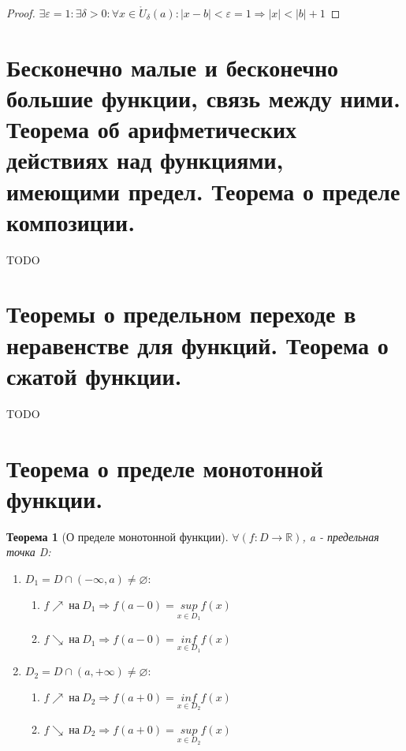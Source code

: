 \documentclass[11pt,a4paper,titlepage]{article}
\newtheorem*{theorem}{Теорема}
\renewcommand{\sup}[1]{\underset{#1}{sup}}
\renewcommand{\inf}[1]{\underset{#1}{inf}}
\renewcommand{\implies}{\Rightarrow}
\renewcommand{\emptyset}{\varnothing}
\renewcommand{\epsilon}{\varepsilon}
\newcommand{\R}{\mathbb{R}}
\renewcommand{\U}{\mathring{U}}
\begin{document}
    \begin{proof}
        $\exists \epsilon = 1: \exists \delta > 0: \forall x \in \U_\delta(a): |x-b| < \epsilon = 1 \implies |x| < |b| + 1$
    \end{proof}


    \section{Бесконечно малые и бесконечно большие функции, связь между ними. Теорема об арифметических действиях над функциями, имеющими предел. Теорема о пределе композиции.} TODO


    \section{Теоремы о предельном переходе в неравенстве для функций. Теорема о сжатой функции.} TODO


    \section{Теорема о пределе монотонной функции.}

    \begin{theorem}[О пределе монотонной функции]
        $\forall (f: D \to \R)$, a - предельная точка D:\\
        \begin{enumerate}
            \item $D_1 = D \cap (-\infty, a) \neq \emptyset:$\\
            \begin{enumerate}
                \item $f\nearrow\ на\ D_1 \implies f(a-0)=\sup{x\in D_1}f(x)$
                \item $f\searrow\ на\ D_1 \implies f(a-0)=\inf{x\in D_1}f(x)$
            \end{enumerate}
            \item $D_2 = D \cap (a, +\infty) \neq \emptyset:$\\
            \begin{enumerate}
                \item $f\nearrow\ на\ D_2 \implies f(a+0)=\inf{x\in D_2}f(x)$
                \item $f\searrow\ на\ D_2 \implies f(a+0)=\sup{x\in D_2}f(x)$
            \end{enumerate}
        \end{enumerate}
    \end{theorem}
\end{document}
